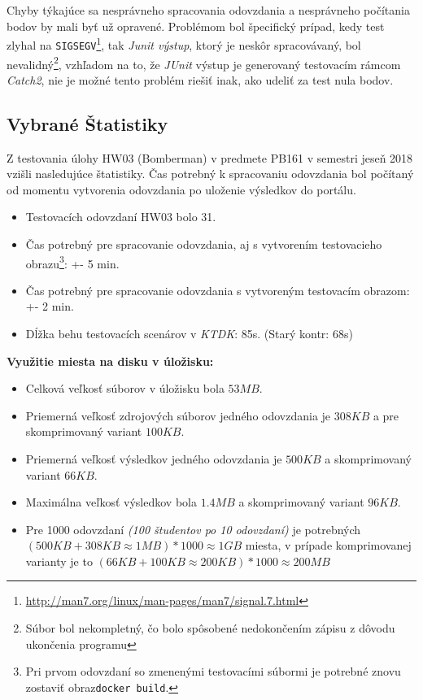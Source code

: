\documentclass[
  digital, %
  twoside, %
  table,   %
  lof,     %
  lot,     %
]{fithesis3}
\begin{document}
Chyby týkajúce sa nesprávneho spracovania odovzdania a nesprávneho počítania bodov by mali byť už opravené. Problémom bol špecifický prípad, kedy test zlyhal na \texttt{SIGSEGV}\footnote{\url{http://man7.org/linux/man-pages/man7/signal.7.html}}, tak \emph{Junit výstup}, ktorý je neskôr spracovávaný, bol nevalidný\footnote{Súbor bol nekompletný, čo bolo spôsobené nedokončením zápisu z dôvodu ukončenia programu}, vzhľadom na to, že \emph{JUnit} výstup je generovaný testovacím rámcom \emph{Catch2}, nie je možné tento problém riešiť inak, ako udeliť za test nula bodov. 



\subsection{Vybrané Štatistiky}

Z testovania úlohy HW03 (Bomberman) v predmete PB161 v semestri jeseň 2018 vzišli nasledujúce štatistiky.
Čas potrebný k spracovaniu odovzdania bol počítaný od momentu vytvorenia odovzdania po uloženie výsledkov do portálu.

\begin{itemize}
    \item Testovacích odovzdaní HW03 bolo 31. 
    \item Čas potrebný pre spracovanie odovzdania, aj s vytvorením testovacieho obrazu\footnote{Pri prvom odovzdaní so zmenenými testovacími súbormi je potrebné znovu zostaviť obraz\texttt{docker build}.}: +- 5 min.
    \item Čas potrebný pre spracovanie odovzdania s vytvoreným testovacím obrazom: +- 2 min.
    \item Dĺžka behu testovacích scenárov v \emph{KTDK}: 85s. (Starý kontr: 68s)
\end{itemize}

\textbf{Využitie miesta na disku v úložisku:}

\begin{itemize}
    \item Celková veľkosť súborov v úložisku bola $53MB$.
    \item Priemerná veľkosť zdrojových súborov jedného odovzdania je $308KB$ a pre skomprimovaný variant $100KB$.
    \item Priemerná veľkosť výsledkov jedného odovzdania je $500KB$ a skomprimovaný variant $66 KB$.
    \item Maximálna veľkosť výsledkov bola $1.4MB$ a skomprimovaný variant $96KB$.
    \item Pre 1000 odovzdaní \emph{(100 študentov po 10 odovzdaní)} je potrebných $(500 KB + 308KB \approx 1MB) * 1000 \approx 1 GB$ miesta, v prípade komprimovanej varianty je to $(66KB + 100KB \approx 200KB) * 1000 \approx 200MB$
\end{itemize}
\end{document}
